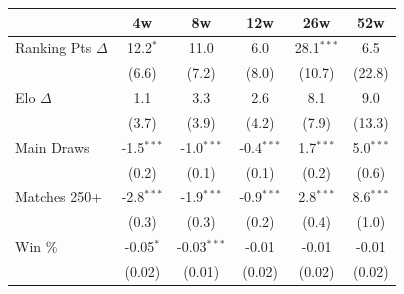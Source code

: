 \begin{tabular}{l*{5}{c}}
\toprule
 & 4w & 8w & 12w & 26w & 52w \\
\midrule
Ranking Pts $\Delta$ & 12.2$^{*}$ & 11.0 & 6.0 & 28.1$^{***}$ & 6.5 \\
 & (6.6) & (7.2) & (8.0) & (10.7) & (22.8) \\[0.3em]
Elo $\Delta$ & 1.1 & 3.3 & 2.6 & 8.1 & 9.0 \\
 & (3.7) & (3.9) & (4.2) & (7.9) & (13.3) \\[0.3em]
Main Draws & -1.5$^{***}$ & -1.0$^{***}$ & -0.4$^{***}$ & 1.7$^{***}$ & 5.0$^{***}$ \\
 & (0.2) & (0.1) & (0.1) & (0.2) & (0.6) \\[0.3em]
Matches 250+ & -2.8$^{***}$ & -1.9$^{***}$ & -0.9$^{***}$ & 2.8$^{***}$ & 8.6$^{***}$ \\
 & (0.3) & (0.3) & (0.2) & (0.4) & (1.0) \\[0.3em]
Win \% & -0.05$^{*}$ & -0.03$^{***}$ & -0.01 & -0.01 & -0.01 \\
 & (0.02) & (0.01) & (0.02) & (0.02) & (0.02) \\[0.3em]
\bottomrule
\end{tabular}
